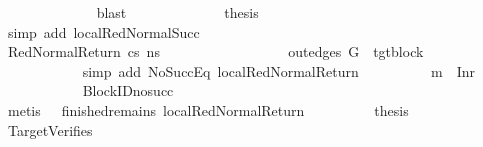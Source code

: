 \begin{isabellebody}
\ \ \ \ \ \ \ \ \ \ \ \ \isamarkupfalse%
\ blast\isanewline
\ \ \ \ \ \ \ \ \ \ \isamarkupfalse%
\ \isamarkupfalse%
\ {\isacharquery}{\kern0pt}thesis\isanewline
\ \ \ \ \ \ \ \ \ \ \ \ \isamarkupfalse%
\ {\isacharparenleft}{\kern0pt}simp\ add{\isacharcolon}{\kern0pt}\ local{\isachardot}{\kern0pt}RedNormalSucc{\isacharparenleft}{\kern0pt}{}{\isacharparenright}{\kern0pt}{\isacharparenright}{\kern0pt}\isanewline
\ \ \ \ \ \ \ \ \isamarkupfalse%
\isanewline
\ \ \ \ \ \ \isamarkupfalse%
\isanewline
\ \ \ \ \ \ \ \ \isamarkupfalse%
\ {\isacharparenleft}{\kern0pt}RedNormalReturn\ cs\ ns{\isacharprime}{\kern0pt}{\isacharparenright}{\kern0pt}\ \ \ \ \ \ \ \ \isanewline
\ \ \ \ \ \ \ \ \isamarkupfalse%
\ {\isachardoublequoteopen}out{\isacharunderscore}{\kern0pt}edges\ G{\isacharprime}{\kern0pt}\ {\isacharbang}{\kern0pt}\ tgt{\isacharunderscore}{\kern0pt}block\ {\isacharequal}{\kern0pt}\ {\isacharbrackleft}{\kern0pt}{\isacharbrackright}{\kern0pt}{\isachardoublequoteclose}\isanewline
\ \ \ \ \ \ \ \ \ \ \isamarkupfalse%
\ {\isacharparenleft}{\kern0pt}simp\ add{\isacharcolon}{\kern0pt}\ NoSuccEq\ local{\isachardot}{\kern0pt}RedNormalReturn{\isacharparenleft}{\kern0pt}{}{\isacharparenright}{\kern0pt}{\isacharparenright}{\kern0pt}\isanewline
\ \ \ \ \ \ \ \ \isamarkupfalse%
\ {\isachardoublequoteopen}m{\isacharprime}{\kern0pt}\ {\isacharequal}{\kern0pt}\ Inr{\isacharparenleft}{\kern0pt}{\isacharparenright}{\kern0pt}{\isachardoublequoteclose}\isanewline
\ \ \ \ \ \ \ \ \ \ \isamarkupfalse%
\ BlockID{\isacharunderscore}{\kern0pt}no{\isacharunderscore}{\kern0pt}succ\isanewline
\ \ \ \ \ \ \ \ \ \ \isamarkupfalse%
\ {\isacharparenleft}{\kern0pt}metis\ {\isachardoublequoteopen}{}{\isachardoublequoteclose}{\isacharparenleft}{\kern0pt}{}{\isacharparenright}{\kern0pt}\ {\isachardoublequoteopen}{}{\isachardoublequoteclose}{\isacharparenleft}{\kern0pt}{}{\isacharparenright}{\kern0pt}\ finished{\isacharunderscore}{\kern0pt}remains\ local{\isachardot}{\kern0pt}RedNormalReturn{\isacharparenleft}{\kern0pt}{}{\isacharparenright}{\kern0pt}{\isacharparenright}{\kern0pt}\isanewline
\ \ \ \ \ \ \isamarkupfalse%
\ \isamarkupfalse%
\ {\isacharquery}{\kern0pt}thesis\isanewline
\ \ \ \ \ \ \ \ \isamarkupfalse%
\ TargetVerifies\isanewline

\end{isabellebody}
